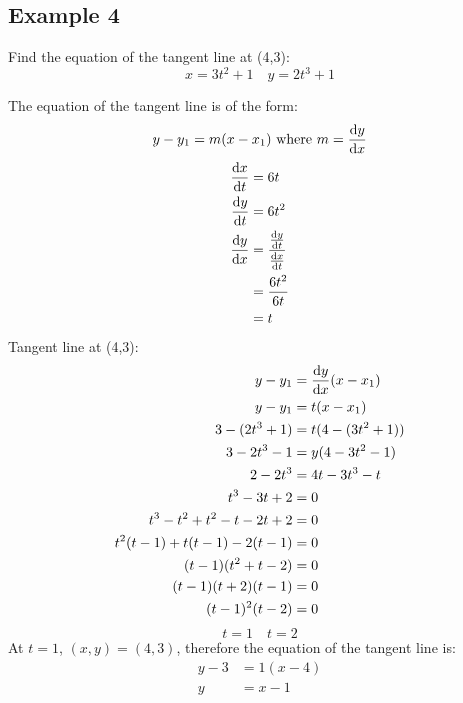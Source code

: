 \documentclass[letterpaper, 12pt]{math}
\begin{document}
\subsection*{Example 4}
Find the equation of the tangent line at (4,3):
\[ x = 3t^{2}+1 \quad y = 2t^{3}+1 \]
\begin{center}
\end{center}
The equation of the tangent line is of the form:
\[ y-y_{1}=m(x-x_{1}) \mathrm{\ where\ } m = \frac{\mathrm{d}{y}}{\mathrm{d}{x}} \]
\begin{align*}
  \frac{\mathrm{d}{x}}{\mathrm{d}{t}} &= 6t \\
  \frac{\mathrm{d}{y}}{\mathrm{d}{t}} &= 6t^{2} \\
  \frac{\mathrm{d}{y}}{\mathrm{d}{x}} &=
    \frac{\frac{\mathrm{d}{y}}{\mathrm{d}{t}}}{\frac{\mathrm{d}{x}}{\mathrm{d}{t}}} \\
  &= \frac{6t^{2}}{6t} \\
  &= t
\end{align*}
Tangent line at (4,3):
\begin{align*}
  y-y_{1} &= \frac{\mathrm{d}{y}}{\mathrm{d}{x}}(x-x_{1}) \\
  y-y_{1} &= t(x-x_{1}) \\
  3-(2t^{3}+1) &= t(4-(3t^{2}+1)) \\
  3-2t^{3}-1 &= y(4-3t^{2}-1) \\
  2-2t^{3} &= 4t-3t^{3}-t \\
  t^{3}-3t+2 &= 0 \\
  t^{3}-t^{2}+t^{2}-t-2t+2 &= 0 \\
  t^{2}(t-1)+t(t-1)-2(t-1) &= 0 \\
  (t-1)(t^{2}+t-2) &= 0 \\
  (t-1)(t+2)(t-1) &= 0 \\
  (t-1)^{2}(t-2) &= 0
\end{align*}
\[ t = 1 \quad t = 2 \]
At \( t = 1 \), \( (x, y) = (4,3) \), therefore the equation of the tangent
line is:
\begin{align*}
  y-3 &= 1(x-4) \\
  y &= x - 1
\end{align*}
\end{document}
